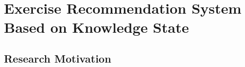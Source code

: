 \chapter{Exercise Recommendation System Based on Knowledge State}

\ifpdf
  \graphicspath{{Chapter4/Figs/Raster/}{Chapter4/Figs/PDF/}{Chapter4/Figs/}}
\else
  \graphicspath{{Chapter4/Figs/Vector/}{Chapter4/Figs/}}
\fi

\section{Research Motivation}


